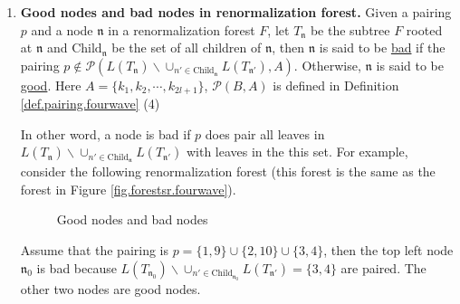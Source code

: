 \begin{defn}
\begin{enumerate}
 \item \textbf{Good nodes and bad nodes in renormalization forest.} Given a pairing $p$ and a node $\mathfrak{n}$ in a renormalization forest $F$, let $T_{\mathfrak{n}}$ be the subtree $F$ rooted at $\mathfrak{n}$ and $\text{Child}_{\mathfrak{n}}$ be the set of all children of $\mathfrak{n}$, then $\mathfrak{n}$ is said to be \underline{bad} if the pairing $p\notin \mathcal{P}(L(T_{\mathfrak{n}})\backslash\cup_{n'\in \text{Child}_{\mathfrak{n}}} L(T_{\mathfrak{n}'}),A)$. Otherwise, $\mathfrak{n}$ is said to be \underline{good}. Here $A=\{k_1,k_2,\cdots,k_{2l+1}\}$, $\mathcal{P}(B,A)$ is defined in Definition \ref{def.pairing.fourwave} (4)
 
 In other word, a node is bad if $p$ does pair all leaves in $L(T_{\mathfrak{n}})\backslash\cup_{n'\in \text{Child}_{\mathfrak{n}}} L(T_{\mathfrak{n}'})$ with leaves in the this set. For example, consider the following renormalization forest (this forest is the same as the forest in Figure \ref{fig.forestsr.fourwave}).
 \begin{figure}[H]
 \centering
 \caption{Good nodes and bad nodes}
 \label{fig.goodbadnodes.fourwave}
 \end{figure}
 Assume that the pairing is $p=\{1,9\}\cup\{2,10\}\cup\{3,4\}$, then the top left node $\mathfrak{n}_0$ is bad because $L(T_{\mathfrak{n}_0})\backslash\cup_{n'\in \text{Child}_{\mathfrak{n}_0}} L(T_{\mathfrak{n}'})=\{3,4\}$ are paired. The other two nodes are good nodes.


\end{enumerate}
\end{defn}
